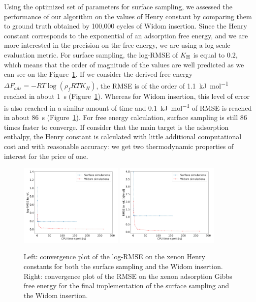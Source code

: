 \documentclass[main]{subfiles}
\begin{document}
Using the optimized set of parameters for surface sampling, we assessed the performance of our algorithm on the values of Henry constant by comparing them to ground truth obtained by 100,000 cycles of Widom insertion. Since the Henry constant corresponds to the exponential of an adsorption free energy, and we are more interested in the precision on the free energy, we are using a log-scale evaluation metric. For surface sampling, the log-RMSE of $K_{\text{H}}$ is equal to $0.2$, which means that the order of magnitude of the values are well predicted as we can see on the Figure~\ref{fgr:convergence_free_energy}. If we consider the derived free energy $\Delta F_{ads} = -RT \log(\rho_fRT K_H)$, the RMSE is of the order of \SI{1.1}{\kilo\joule\per\mole} reached in about \SI{1}{\second} (Figure~\ref{fgr:convergence_free_energy}). Whereas for Widom insertion, this level of error is also reached in a similar amount of time and \SI{0.1}{\kilo\joule\per\mole} of RMSE is reached in about \SI{86}{\second} (Figure~\ref{fgr:convergence_free_energy}). For free energy calculation, surface sampling is still 86 times faster to converge. If consider that the main target is the adsorption enthalpy, the Henry constant is calculated with little additional computational cost and with reasonable accuracy: we get two thermodynamic properties of interest for the price of one.

\begin{figure}[ht]
  \centering
  \includegraphics[width=0.45\textwidth]{figures/3-fastsim/log_henry_convergence.jpg}
  \includegraphics[width=0.45\textwidth]{figures/3-fastsim/gibbs_free_energy_convergence.jpg}
  \caption{ Left: convergence plot of the log-RMSE on the xenon Henry constants for both the surface sampling and the Widom insertion. Right: convergence plot of the RMSE on the xenon adsorption Gibbs free energy for the final implementation of the surface sampling and the Widom insertion. }\label{fgr:convergence_free_energy}
\end{figure}
\end{document}

